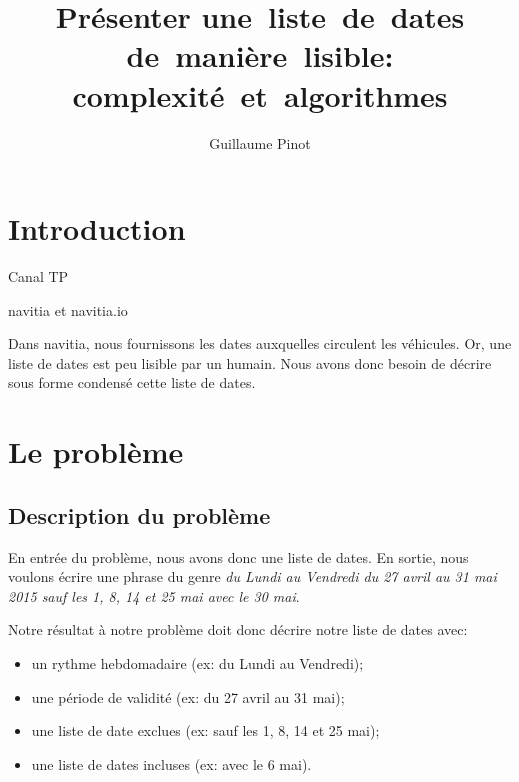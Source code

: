 \documentclass{roadef}
\begin{document}
\title{Présenter une~liste~de~dates de~manière~lisible: complexité~et~algorithmes}

\def\shorttitle{Présenter une~liste~de~dates de~manière~lisible}

\author{Guillaume Pinot}

{}

\maketitle
\thispagestyle{empty}



\section{Introduction}

Canal TP

navitia et navitia.io

Dans navitia, nous fournissons les dates auxquelles circulent les
véhicules.  Or, une liste de dates est peu lisible par un humain. Nous
avons donc besoin de décrire sous forme condensé cette liste de dates.

\section{Le problème}

\subsection{Description du problème}

En entrée du problème, nous avons donc une liste de dates.  En sortie,
nous voulons écrire une phrase du genre \emph{du Lundi au Vendredi du
  27 avril au 31 mai 2015 sauf les 1, 8, 14 et 25 mai avec le 30 mai}.

Notre résultat à notre problème doit donc décrire notre liste de dates
avec:
\begin{itemize}
\item un rythme hebdomadaire (ex: du Lundi au Vendredi);
\item une période de validité (ex: du 27 avril au 31 mai);
\item une liste de date exclues (ex: sauf les 1, 8, 14 et 25 mai);
\item une liste de dates incluses (ex: avec le 6 mai).
\end{itemize}
\end{document}
